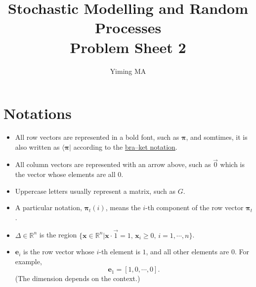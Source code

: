 \documentclass[a4paper,12pt]{article}
\title{Stochastic Modelling and Random Processes\\ Problem Sheet 2}
\author{Yiming MA}
\newcommand{\mbf}[1]{\pmb{#1}}
\begin{document}
    \maketitle

    \tableofcontents

    \section{Notations}
    \begin{itemize}
        \item All row vectors are represented in a bold font, such as $\mbf{\pi}$, and somtimes, it is also written as $\langle \mbf{\pi} |$ according to the \href{https://en.wikipedia.org/wiki/Bra%E2%80%93ket_notation}{bra–ket notation}.
        
        \item All column vectors are represented with an arrow above, such as $\vec{0}$ which is the vector whose elements are all $0$.
        
        \item Uppercase letters usually represent a matrix, such as $G$.
        
        \item A particular notation, $\mbf{\pi}_t(i)$, means the $i$-th component of the row vector $\mbf{\pi}_t$.
        
        \item $\Delta \in \mathbb{R}^n$ is the region $\{\mbf{x} \in \mathbb{R}^n | \mbf{x} \cdot \vec{1} = 1, \, \mbf{x}_i \ge 0,\, i = 1,\cdots,n\}$.
        
        \item $\mbf{e}_i$ is the row vector whose $i$-th element is $1$, and all other elements are $0$. For example, 
        $$\mbf{e}_1 = [1, 0, \cdots , 0].$$
        (The dimension depends on the context.)
    \end{itemize}






\printbibliography[type=article,title={Reference}]
\end{document}
